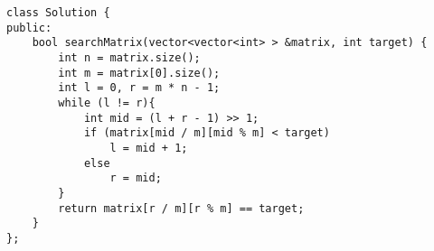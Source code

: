 \begin{description}
\begin{lstlisting}
class Solution {
public:
    bool searchMatrix(vector<vector<int> > &matrix, int target) {
        int n = matrix.size();
        int m = matrix[0].size();
        int l = 0, r = m * n - 1;
        while (l != r){
            int mid = (l + r - 1) >> 1;
            if (matrix[mid / m][mid % m] < target)
                l = mid + 1;
            else 
                r = mid;
        }
        return matrix[r / m][r % m] == target;
    }
};
		\end{lstlisting}
\end{description}


